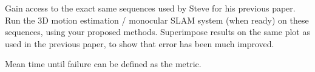 Gain access to the exact same sequences used by Steve for his previous paper. 
Run the 3D motion estimation / monocular SLAM system (when ready) on these sequences, using your proposed methods. 
Superimpose results on the same plot as used in the previous paper, to show that error has been much improved.

Mean time until failure can be defined as the metric.